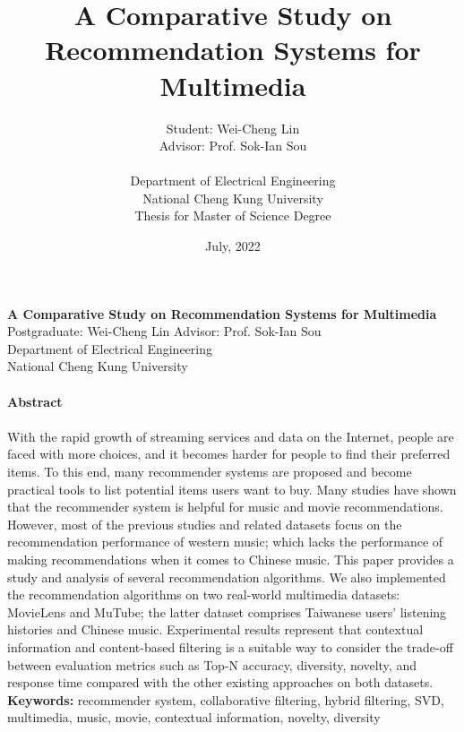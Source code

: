\documentclass[a4paper,12pt]{report}
\title{A Comparative Study on Recommendation Systems for Multimedia \\}
\author{Student: Wei-Cheng Lin \\
Advisor: Prof. Sok-Ian Sou\\
\\
Department of Electrical Engineering  \\
National Cheng Kung University \\
Thesis for Master of Science Degree \\
}
\date{July, 2022}
\begin{document}

\maketitle

\begin{titlepage}
    \begin{center}
        {\bf\large A Comparative Study on Recommendation Systems for Multimedia}\\
        {Postgraduate: Wei-Cheng Lin \hspace{8mm} Advisor: Prof. Sok-Ian Sou}\\
        {Department of Electrical Engineering}\\
        {National Cheng Kung University}\\
    \end{center}

    \paragraph{}
    \begin{center}
        {\bf Abstract}\\
    \end{center}
    \paragraph{}
    With the rapid growth of streaming services and data on the Internet, people are faced with more choices, and it becomes harder for people to find their preferred items. To this end, many recommender systems are proposed and become practical tools to list potential items users want to buy. Many studies have shown that the recommender system is helpful for music and movie recommendations. However, most of the previous studies and related datasets focus on the recommendation performance of western music; which lacks the performance of making recommendations when it comes to Chinese music. This paper provides a study and analysis of several recommendation algorithms. We also implemented the recommendation algorithms on two real-world multimedia datasets: MovieLens and MuTube; the latter dataset comprises Taiwanese users' listening histories and Chinese music. Experimental results represent that contextual information and content-based filtering is a suitable way to consider the trade-off between evaluation metrics such as Top-N accuracy, diversity, novelty, and response time compared with the other existing approaches on both datasets.\\
 
    \textbf{Keywords:} {recommender system, collaborative filtering, hybrid filtering, SVD, multimedia, music, movie, contextual information, novelty, diversity}
\end{titlepage}
\end{document}
